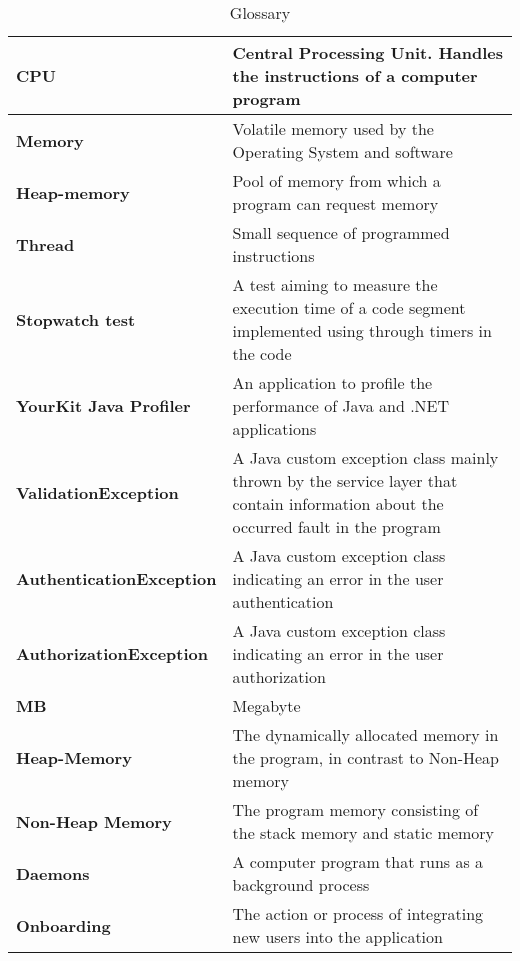 \begin{longtable}{|m{4cm}|l|l|} 
\caption[]{Glossary} 
\hline 
\cellcolor[HTML]{C0C0C0}\textbf{CPU} & \multicolumn{2}{p{13cm}|}{Central Processing Unit. Handles the instructions of a computer program}\\ \hline 
\cellcolor[HTML]{C0C0C0}\textbf{Memory} & \multicolumn{2}{p{13cm}|}{Volatile memory used by the Operating System and software}\\ \hline 
\cellcolor[HTML]{C0C0C0}\textbf{Heap-memory} & \multicolumn{2}{p{13cm}|}{Pool of memory from which a program can request memory}\\ \hline 
\cellcolor[HTML]{C0C0C0}\textbf{Thread} & \multicolumn{2}{p{13cm}|}{Small sequence of programmed instructions}\\ \hline 
\cellcolor[HTML]{C0C0C0}\textbf{Stopwatch test} & \multicolumn{2}{p{13cm}|}{A test aiming to measure the execution time of a code segment implemented using through timers in the code}\\ \hline 
\cellcolor[HTML]{C0C0C0}\textbf{YourKit Java Profiler} & \multicolumn{2}{p{13cm}|}{An application to profile the performance of Java and .NET applications}\\ \hline 
\cellcolor[HTML]{C0C0C0}\textbf{ValidationException} & \multicolumn{2}{p{13cm}|}{A Java custom exception class mainly thrown by the service layer that contain information about the occurred fault in the program}\\ \hline 
\cellcolor[HTML]{C0C0C0}\textbf{AuthenticationException} & \multicolumn{2}{p{13cm}|}{A Java custom exception class indicating an error in the user authentication}\\ \hline 
\cellcolor[HTML]{C0C0C0}\textbf{AuthorizationException} & \multicolumn{2}{p{13cm}|}{A Java custom exception class indicating an error in the user authorization}\\ \hline 
\cellcolor[HTML]{C0C0C0}\textbf{MB} & \multicolumn{2}{p{13cm}|}{Megabyte}\\ \hline 
\cellcolor[HTML]{C0C0C0}\textbf{Heap-Memory} & \multicolumn{2}{p{13cm}|}{The dynamically allocated memory in the program, in contrast to Non-Heap memory}\\ \hline 
\cellcolor[HTML]{C0C0C0}\textbf{Non-Heap Memory} & \multicolumn{2}{p{13cm}|}{The program memory consisting of the stack memory and static memory}\\ \hline 
\cellcolor[HTML]{C0C0C0}\textbf{Daemons} & \multicolumn{2}{p{13cm}|}{A computer program that runs as a background process}\\ \hline 
\cellcolor[HTML]{C0C0C0}\textbf{Onboarding} & \multicolumn{2}{p{13cm}|}{The action or process of integrating new users into the application}\\ \hline 
\end{longtable}

